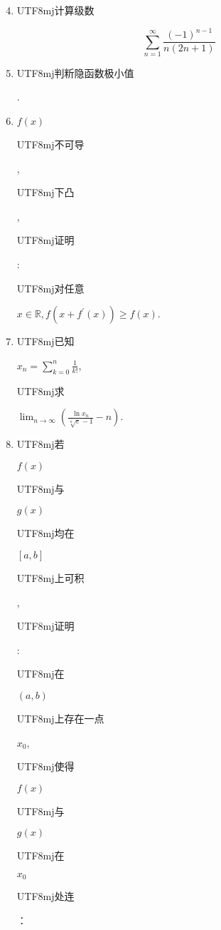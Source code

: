 \documentclass[10pt]{article}
\begin{document}
\begin{enumerate}
  \setcounter{enumi}{3}
  \item \begin{CJK}{UTF8}{mj}计算级数\end{CJK}
\end{enumerate}
$$
\sum_{n=1}^{\infty} \frac{(-1)^{n-1}}{n(2 n+1)}
$$

\begin{enumerate}
  \setcounter{enumi}{4}
  \item \begin{CJK}{UTF8}{mj}判䉼隐函数极小值\end{CJK}.

  \item $f(x)$ \begin{CJK}{UTF8}{mj}不可导\end{CJK}, \begin{CJK}{UTF8}{mj}下凸\end{CJK}, \begin{CJK}{UTF8}{mj}证明\end{CJK}: \begin{CJK}{UTF8}{mj}对任意\end{CJK} $x \in \mathbb{R}, f\left(x+f^{\prime}(x)\right) \geq f(x)$.

  \item \begin{CJK}{UTF8}{mj}已知\end{CJK} $x_{n}=\sum_{k=0}^{n} \frac{1}{k !}$, \begin{CJK}{UTF8}{mj}求\end{CJK} $\lim _{n \rightarrow \infty}\left(\frac{\ln x_{n}}{\sqrt[n]{e}-1}-n\right)$.

  \item \begin{CJK}{UTF8}{mj}若\end{CJK} $f(x)$ \begin{CJK}{UTF8}{mj}与\end{CJK} $g(x)$ \begin{CJK}{UTF8}{mj}均在\end{CJK} $[a, b]$ \begin{CJK}{UTF8}{mj}上可积\end{CJK}, \begin{CJK}{UTF8}{mj}证明\end{CJK}: \begin{CJK}{UTF8}{mj}在\end{CJK} $(a, b)$ \begin{CJK}{UTF8}{mj}上存在一点\end{CJK} $x_{0}$, \begin{CJK}{UTF8}{mj}使得\end{CJK} $f(x)$ \begin{CJK}{UTF8}{mj}与\end{CJK} $g(x)$ \begin{CJK}{UTF8}{mj}在\end{CJK} $x_{0}$ \begin{CJK}{UTF8}{mj}处连\end{CJK}：

\end{enumerate}
\end{document}
